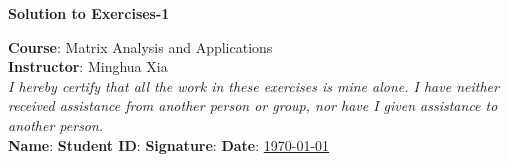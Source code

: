 \documentclass[12pt, letterpaper, onecolumn]{article}
\begin{document}
	\begin{center}
		\large \textbf{Solution to Exercises-1 }
	\end{center}
	\vspace{0.3cm}
	\textbf{Course}: Matrix Analysis and Applications \\
	\textbf{Instructor}: Minghua Xia \\

	\textit{I hereby certify that all the work in these exercises is mine alone. 
	I have neither received assistance from another person or group, 
	nor have I given assistance to another person.} \\

	\textbf{Name}: \underline{} 
	\textbf{Student ID}: \underline{} 
	\textbf{Signature}: \underline{\makebox[5em]{}} 
	\textbf{Date}: \underline{\today} 
\end{document}
